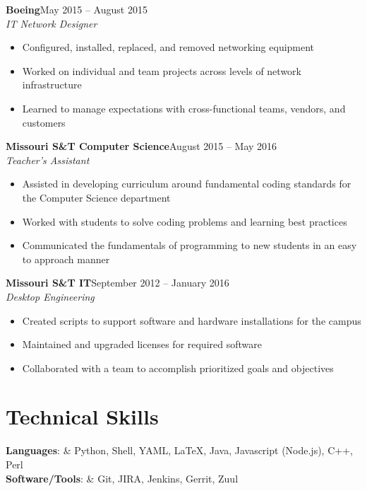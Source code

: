 \documentclass[margin]{res}
\begin{document}
   \textbf{Boeing}\hfill May 2015 -- August 2015 \\
   \textit{IT Network Designer}\hfill 
   \begin{itemize} \itemsep -1pt  %
     \item Configured, installed, replaced, and removed networking equipment
     \item Worked on individual and team projects across levels of network infrastructure
     \item Learned to manage expectations with cross-functional teams, vendors, and customers
   \end{itemize}

   \textbf{Missouri S\&T Computer Science}\hfill August 2015 -- May 2016\\
   \textit{Teacher's Assistant} 
   \begin{itemize} \itemsep -1pt  %
     \item Assisted in developing curriculum around fundamental coding standards for the Computer Science department
     \item Worked with students to solve coding problems and learning best practices
     \item Communicated the fundamentals of programming to new students in an easy to approach manner
   \end{itemize}

	   \textbf{Missouri S\&T IT}\hfill September 2012 -- January 2016\\
   \textit{Desktop Engineering}\hfill
   \begin{itemize} \itemsep -1pt  %
     \item Created scripts to support software and hardware installations for the campus
     \item Maintained and upgraded licenses for required software
     \item Collaborated with a team to accomplish prioritized goals and objectives
   \end{itemize}
   
\section{Technical Skills}
    \textbf{Languages}: & Python, Shell, YAML, \LaTeX, Java, Javascript (Node.js), C++, Perl \\
    \textbf{Software/Tools}: & Git, JIRA, Jenkins, Gerrit, Zuul
\end{document}
